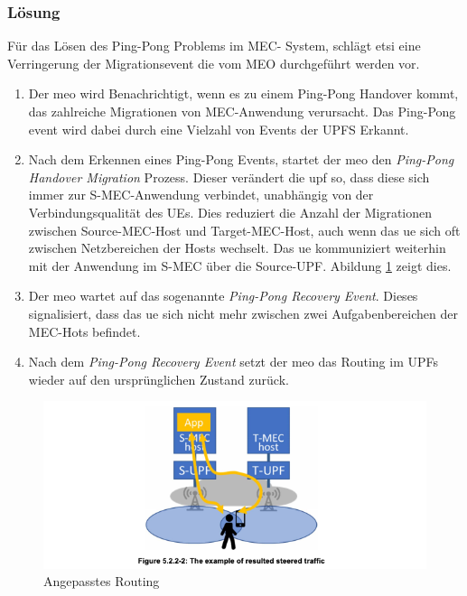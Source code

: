 \documentclass[runningheads]{llncs}
\numberwithin{figure}{section}
\begin{document}
\subsubsection{Lösung}
Für das Lösen des Ping-Pong Problems im MEC- System, schlägt \acrshort{etsi} eine Verringerung der Migrationsevent die vom MEO durchgeführt werden vor.
\begin{enumerate}
  \item Der \acrshort{meo} wird Benachrichtigt, wenn es zu einem Ping-Pong Handover kommt, das zahlreiche Migrationen von MEC-Anwendung verursacht. Das
  Ping-Pong event wird dabei durch eine Vielzahl von Events der UPFS Erkannt.
  \item Nach dem Erkennen eines Ping-Pong Events, startet der \acrshort{meo} den \textit{Ping-Pong Handover Migration} Prozess. Dieser verändert die \acrshort{upf}
  so, dass diese sich immer zur S-MEC-Anwendung verbindet, unabhängig von der Verbindungsqualität des UEs. Dies reduziert die Anzahl der Migrationen
  zwischen Source-MEC-Host und Target-MEC-Host, auch wenn das \acrshort{ue} sich oft zwischen Netzbereichen der Hosts wechselt. Das \acrshort{ue} kommuniziert weiterhin
  mit der Anwendung im S-MEC über die Source-UPF. Abildung \ref{fig:pingpongrouting} zeigt dies.
  \item Der \acrshort{meo} wartet auf das sogenannte \textit{Ping-Pong Recovery Event}. Dieses signalisiert, dass das \acrshort{ue} sich nicht mehr zwischen zwei
  Aufgabenbereichen der MEC-Hots befindet.
  \item Nach dem \textit{Ping-Pong Recovery Event} setzt der \acrshort{meo} das Routing im UPFs wieder auf den ursprünglichen Zustand zurück.
\end{enumerate}
\begin{figure}
  \includegraphics[width=\linewidth]{images/pingpongrouting.png}
  \caption{Angepasstes Routing}
  \label{fig:pingpongrouting}
\end{figure}
\end{document}
